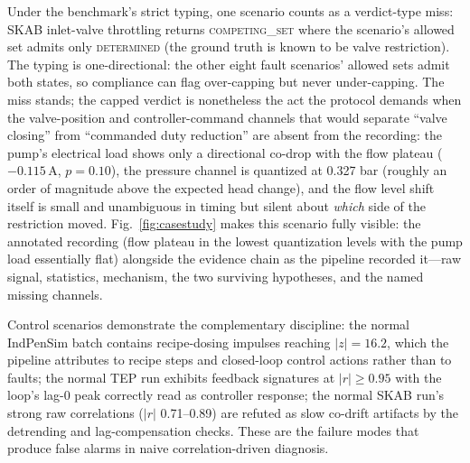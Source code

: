 \documentclass[preprint,10pt]{elsarticle}
\begin{document}
Under the benchmark's strict typing, one scenario counts as a verdict-type miss: SKAB inlet-valve throttling returns \mbox{\textsc{competing\_set}} where the scenario's allowed set admits only \mbox{\textsc{determined}} (the ground truth is known to be valve restriction). The typing is one-directional: the other eight fault scenarios' allowed sets admit both states, so compliance can flag over-capping but never under-capping. The miss stands; the capped verdict is nonetheless the act the protocol demands when the valve-position and controller-command channels that would separate ``valve closing'' from ``commanded duty reduction'' are absent from the recording: the pump's electrical load shows only a directional co-drop with the flow plateau ($-0.115$\,A, $p{=}0.10$), the pressure channel is quantized at 0.327 bar (roughly an order of magnitude above the expected head change), and the flow level shift itself is small and unambiguous in timing but silent about \emph{which} side of the restriction moved. Fig.~\ref{fig:casestudy} makes this scenario fully visible: the annotated recording (flow plateau in the lowest quantization levels with the pump load essentially flat) alongside the evidence chain as the pipeline recorded it---raw signal, statistics, mechanism, the two surviving hypotheses, and the named missing channels.

Control scenarios demonstrate the complementary discipline: the normal IndPenSim batch contains recipe-dosing impulses reaching $|z|{=}16.2$, which the pipeline attributes to recipe steps and closed-loop control actions rather than to faults; the normal TEP run exhibits feedback signatures at $|r|\ge 0.95$ with the loop's lag-0 peak correctly read as controller response; the normal SKAB run's strong raw correlations ($|r|$ 0.71--0.89) are refuted as slow co-drift artifacts by the detrending and lag-compensation checks. These are the failure modes that produce false alarms in naive correlation-driven diagnosis.
\end{document}
